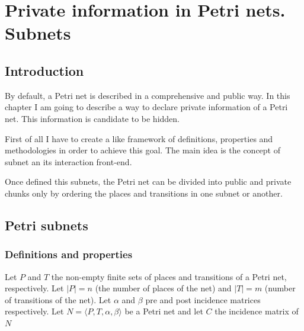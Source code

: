 
\chapter{Private information in Petri nets. Subnets} %

\label{Chapter3} %



\section{Introduction}
By default, a Petri net is described in a comprehensive and public way.
In this chapter I am going to describe a way to declare private information of a Petri net.
This information is candidate to be hidden.


First of all I have to create a like framework of definitions, properties
and methodologies in order to achieve this goal. The main idea is the concept
of subnet an its interaction front-end.

Once defined this subnets, the Petri net can be divided into public and private
chunks only by ordering the places and transitions in one subnet or another. \section{Petri subnets}

\subsection{Definitions and properties}

Let $ P $ and $ T $ the non-empty finite sets of places and
transitions of a Petri net, respectively. Let $ | P | = n $ (the number of places
of the net) and $ | T | = m $ (number of transitions of the net). Let $ \alpha $ and $ \beta $ pre and post incidence matrices respectively. Let $ N = \langle P, T, \alpha, \beta \rangle $ be a
Petri net and let $ C $ the incidence matrix of $ N $

